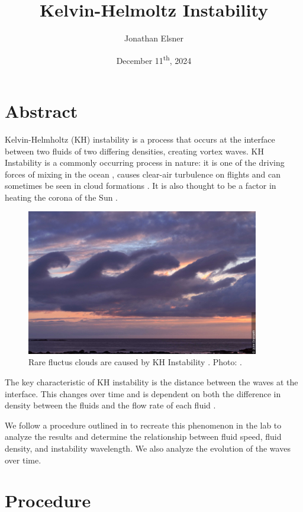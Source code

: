 \documentclass{article}
\title{Kelvin-Helmoltz Instability}
\author{Jonathan Elsner}
\date{December 11\textsuperscript{th}, 2024}
\begin{document}
\maketitle

\section{Abstract}

Kelvin-Helmholtz (KH) instability is a process that occurs at the interface
between two fluids of two differing densities, creating vortex waves. KH
Instability is a commonly occurring process in nature: it is one of the driving
forces of mixing in the ocean \cite{woods-1968}, causes clear-air turbulence on
flights and can sometimes be seen in cloud formations \cite{ludlam-1967}. It is
also thought to be a factor in heating the corona of the Sun
\cite{nasa-solar-surfer}.

\begin{figure}[h]
    \centering
    \includegraphics[width=4in]{kh-instability-clouds-2.jpg}
    \caption{Rare fluctus clouds are caused by KH Instability \cite{ludlam-1967}. Photo: \cite{fluctus-clouds}.}
    \label{img:fluctus-clouds}
\end{figure}

The key characteristic of KH instability is the distance between the waves at
the interface. This changes over time and is dependent on both the difference in
density between the fluids and the flow rate of each fluid \cite{kundu}.

We follow a procedure outlined in \cite{kh-instability-demo} to recreate this
phenomenon in the lab to analyze the results and determine the relationship
between fluid speed, fluid density, and instability wavelength. We also analyze
the evolution of the waves over time.

\section{Procedure}
\end{document}
